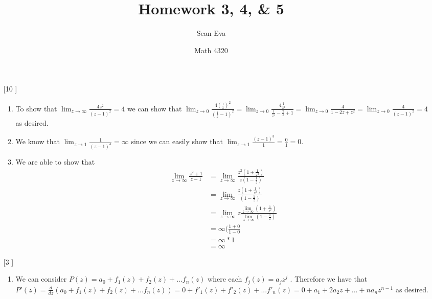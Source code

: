 \documentclass{article}
\title{Homework 3, 4, \& 5}
\author{Sean Eva}
\date{Math 4320}
\theoremstyle{definition}
\begin{document}
\maketitle

\begin{enumerate}
    \item [[\phantom{-}10]]
    
    \begin{enumerate}
        \item 
        
        To show that $\lim_{z\to \infty}\frac{4z^2}{(z-1)^2} = 4$ we can show that $\lim_{z\to 0} \frac{4(\frac{1}{z})^2}{(\frac{1}{z} - 1)^2} = \lim_{z\to 0} \frac{4\frac{1}{z^2}}{\frac{1}{z^2}-\frac{2}{z}+1} = \lim_{z\to 0}\frac{4}{1-2z+z^2} = \lim_{z\to 0} \frac{4}{(z-1)^2} = 4$ as desired.
        
        \item
        
        We know that $\lim_{z\to 1} \frac{1}{(z-1)^3} = \infty$ since we can easily show that $\lim_{z\to 1}\frac{(z-1)^3}{1} = \frac{0}{1} = 0$.
        
        \item
        
        We are able to show that \begin{align*}
            \lim_{z\to \infty} \frac{z^2 + 1}{z - 1} &= \lim_{z \to \infty}\frac{z^2(1 + \frac{1}{z^2})}{z(1-\frac{1}{z})}\\
            &= \lim_{z\to \infty} \frac{z(1 + \frac{1}{z^2})}{(1-\frac{1}{z})}\\
            &= \lim_{z\to\infty}z\frac{\lim_{z\to\infty}(1 + \frac{1}{z^2})}{\lim_{z\to\infty}(1-\frac{1}{z})}\\
            &= \infty (\frac{1 + 0}{1 - 0}\\
            &= \infty * 1\\
            &= \infty
        \end{align*}
        
    \end{enumerate}
    
    \item [[\phantom{-}3]]
    
    \begin{enumerate}
        \item 
        
        We can consider $P(z) = a_0 + f_1(z) + f_2(z) + ... f_n(z)$ where each $f_j(z) = a_jz^j$ . Therefore we have that $P'(z) = \frac{d}{dz}(a_0 + f_1(z) + f_2(z) + ... f_n(z)) = 0 + f'_1(z) + f'_2(z) + ... f'_n(z) = 0 + a_1 + 2a_2z + ... + na_nz^{n-1}$ as desired.
        

\end{enumerate}
\end{enumerate}
\end{document}
